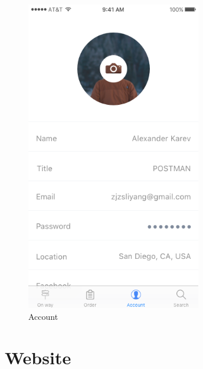 \documentclass[12pt]{scrreprt}
\begin{document}
\begin{figure}[htbp]
  \centering\includegraphics[width=3in]{DocumentRes/Account.png}
  \caption{Account}
\end{figure}

\section{Website}
\end{document}
